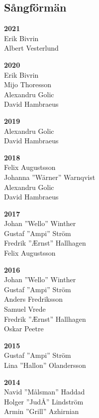 \begin{flushleft}
\section{Sångförmän}
\vspace{-1em}
\end{flushleft}

{\large
\setlength{\parskip}{0.4em}
\setlength\columnsep{.5em}

\begin{multicols}{2}
\textbf{2021}\\
Erik Bivrin\\
Albert Vesterlund

\textbf{2020}\\
Erik Bivrin\\
Mijo Thoresson\\
Alexandru Golic\\
David Hambraeus

\textbf{2019}\\
Alexandru Golic\\
David Hambraeus

\textbf{2018}\\
Felix Augustsson\\
Johanna ''Wärner'' Warnqvist\\
Alexandru Golic\\
David Hambraeus

\textbf{2017}\\
Johan ''Wello'' Winther\\
Gustaf ''Ampi'' Ström\\
Fredrik ''Ærnst'' Hallhagen\\
Felix Augustsson

\textbf{2016}\\
Johan ''Wello'' Winther\\
Gustaf ''Ampi'' Ström\\
Anders Fredriksson\\
Samuel Vrede\\
Fredrik ''Ærnst'' Hallhagen\\
Oskar Peetre

\textbf{2015}\\
Gustaf ''Ampi'' Ström\\
Lina ''Hallon'' Olandersson

\textbf{2014}\\
Navid ''Målsman'' Haddad\\
Holger ''JudÅ'' Lindström\\
Armin ''Grill'' Azhirnian


\end{multicols}}
